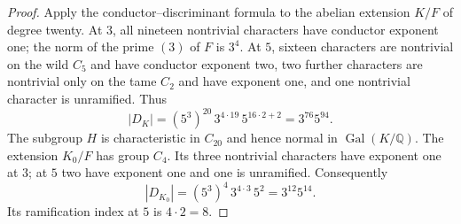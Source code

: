\begin{proof}
Apply the conductor--discriminant formula to the abelian
extension $K/F$ of degree twenty.  At $3$, all nineteen
nontrivial characters have conductor exponent one; the
norm of the prime $(3)$ of $F$ is $3^4$.
At $5$, sixteen characters are nontrivial on the wild
$C_5$ and have conductor exponent two, two further
characters are nontrivial only on the tame $C_2$ and
have exponent one, and one nontrivial character is
unramified.  Thus
\[
 |D_K|=(5^3)^{20}\,3^{4\cdot19}\,5^{16\cdot2+2}
       =3^{76}5^{94}.
\]
The subgroup $H$ is characteristic in $C_{20}$ and hence
normal in $\operatorname{Gal}(K/\mathbb Q)$.
The extension $K_0/F$ has group $C_4$.
Its three nontrivial characters have exponent one at
$3$; at $5$ two have exponent one and one is unramified.
Consequently
\[
 |D_{K_0}|=(5^3)^4\,3^{4\cdot3}\,5^2=3^{12}5^{14}.
\]
Its ramification index at $5$ is $4\cdot2=8$.
\end{proof}

